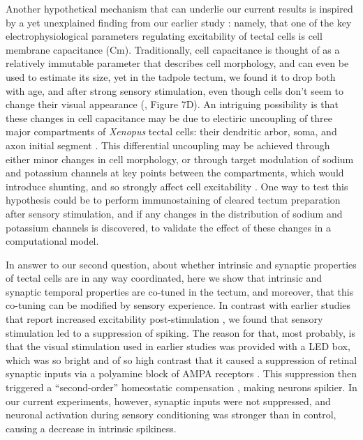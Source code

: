 \documentclass{article}
\begin{document}
Another hypothetical mechanism that can underlie our current results is inspired by a yet unexplained finding from our earlier study \citep{ciarleglio2015}: namely, that one of the key electrophysiological parameters regulating excitability of tectal cells is cell membrane capacitance (Cm). Traditionally, cell capacitance is thought of as a relatively immutable parameter that describes cell morphology, and can even be used to estimate its size, yet in the tadpole tectum, we found it to drop both with age, and after strong sensory stimulation, even though cells don't seem to change their visual appearance (\citealt{ciarleglio2015}, Figure 7D). An intriguing possibility is that these changes in cell capacitance may be due to electiric uncoupling of three major compartments of \textit{Xenopus} tectal cells: their dendritic arbor, soma, and axon initial segment \citep{bollmann2009}. This differential uncoupling may be achieved through either minor changes in cell morphology, or through target modulation of sodium and potassium channels at key points between the compartments, which would introduce shunting, and so strongly affect cell excitability \citep{grubb2010activity,kuba2010initial}. One way to test this hypothesis could be to perform immunostaining of cleared tectum preparation after sensory stimulation, and if any changes in the distribution of sodium and potassium channels is discovered, to validate the effect of these changes in a computational model.

In answer to our second question, about whether intrinsic and synaptic properties of tectal cells are in any way coordinated, here we show that intrinsic and synaptic temporal properties are co-tuned in the tectum, and moreover, that this co-tuning can be modified by sensory experience. In contrast with earlier studies that report increased excitability post-stimulation \citep{aizenman2003,dong2009,ciarleglio2015}, we found that sensory stimulation led to a suppression of spiking. The reason for that, most probably, is that the visual stimulation used in earlier studies was provided with a LED box, which was so bright and of so high contrast that it caused a suppression of retinal synaptic inputs via a polyamine block of AMPA receptors \citep{aizenman2003}. This suppression then triggered a “second-order” homeostatic compensation \citep{turrigiano2011,tien2018}, making neurons spikier. In our current experiments, however, synaptic inputs were not suppressed, and neuronal activation during sensory conditioning was stronger than in control, causing a decrease in intrinsic spikiness.
\end{document}
